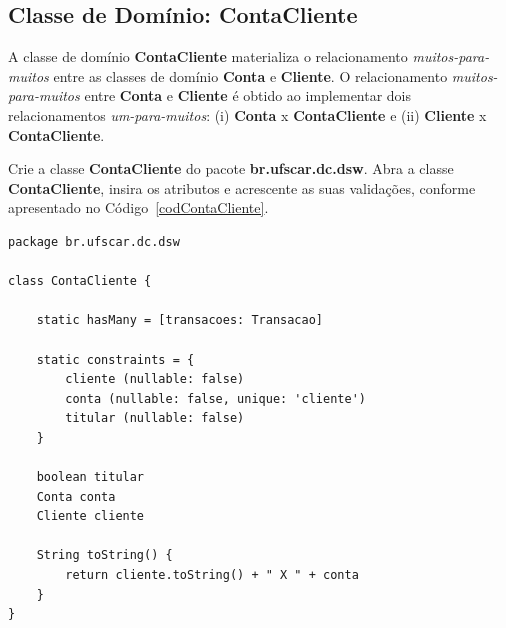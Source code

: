 \newpage

\subsection{Classe de Domínio: ContaCliente}\label{secContaCliente}

\vspace{0.5cm}

A  classe  de  domínio  {\bf  ContaCliente} materializa  o  relacionamento  {\em
  muitos-para-muitos} entre as classes de domínio {\bf Conta} e {\bf Cliente}. O
relacionamento  {\em muitos-para-muitos}  entre {\bf  Conta} e  {\bf  Cliente} é
obtido ao implementar dois relacionamentos {\em um-para-muitos}: (i) {\bf Conta}
x {\bf ContaCliente} e (ii) {\bf Cliente} x {\bf ContaCliente}.

Crie  a classe  {\bf ContaCliente}  do  pacote {\bf  br.ufscar.dc.dsw}.  Abra  a
classe {\bf ContaCliente}, insira os  atributos e acrescente as suas validações,
conforme apresentado no Código~\ref{codContaCliente}.  

\begin{lstlisting}[caption=Classe de  domínio {\bf ContaCliente},  frame = trBL,
    float=htbp, label=codContaCliente] 
package br.ufscar.dc.dsw

class ContaCliente {

    static hasMany = [transacoes: Transacao]
    
    static constraints = {
        cliente (nullable: false)
        conta (nullable: false, unique: 'cliente')
        titular (nullable: false)
    }
    
    boolean titular
    Conta conta
    Cliente cliente
    
    String toString() {
        return cliente.toString() + " X " + conta
    }
}
\end{lstlisting}

\hspace{1cm}\\
\hspace{1cm}\\

